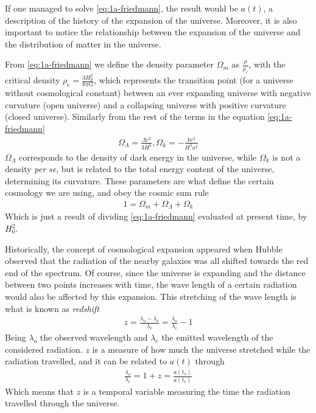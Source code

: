 If one managed to solve \eqref{eq:1a-friedmann}, the result would be $a(t)$, a description of the history of the expansion of the universe. Moreover, it is also important to notice the relationship between the expansion of the universe and the distribution of matter in the universe.

From \eqref{eq:1a-friedmann} we define the density parameter $\Omega_m$ as $\frac{\rho}{\rho_{\text{c}}}$, with the critical density $\rho_{\text{c}} = \frac{3H_0^2}{8\pi G}$, which represents the transition point (for a universe without cosmological constant) between an ever expanding universe with negative curvature (open universe) and a collapsing universe with positive curvature (closed universe). Similarly from the rest of the terms in the equation \eqref{eq:1a-friedmann}
\begin{align}
 \Omega_\Lambda = \frac{\Lambda c^2}{3H^2}, \Omega_k = -\frac{kc^2}{H^2a^2} 
 \label{eq:definitions}
\end{align}
$\Omega_\Lambda$ corresponds to the density of dark energy in the universe, while $\Omega_k$ is not a density \textit{per se}, but is related to the total energy content of the universe, determining its curvature.
These parameters are what define the certain cosmology we are using, and obey the cosmic sum rule 
\begin{align}
	1 = \Omega_m + \Omega_\Lambda + \Omega_k
\end{align}
Which is just a result of dividing \eqref{eq:1a-friedmann} evaluated at present time, by  $H_0^2$.

Historically, the concept of cosmological expansion appeared when Hubble observed that the radiation of the nearby galaxies was all shifted towards the red end of the spectrum. Of course, since the universe is expanding and the distance between two points increases with time, the wave length of a certain radiation would also be affected by this expansion. This stretching of the wave length is what is known as \textit{redshift} 
\begin{align}
	z = \frac{\lambda_{\text{o}} - \lambda_{\text{e}}}{\lambda_{\text{e}}} = \frac{\lambda_o}{\lambda_e} - 1
	\label{eq:redshift}
\end{align}
Being $\lambda_o$ the observed wavelength and $\lambda_e$ the emitted wavelength of the considered radiation. $z$ is a measure of how much the universe stretched while the radiation travelled, and it can be related to $a(t)$ through 
\begin{align}
	\frac{\lambda_o}{\lambda_e} = 1+z = \frac{a(t_o)}{a(t_e)}
\end{align}
Which means that $z$ is a temporal variable measuring the time the radiation travelled through the universe.


